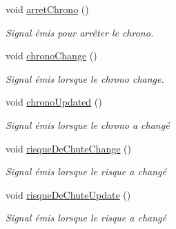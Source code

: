 \begin{DoxyCompactItemize}
void \hyperlink{class_peripherique_local_a150599c1ded2462eb0e2d1d943459a34}{arret\+Chrono} ()
\begin{DoxyCompactList}\small\item\em Signal émis pour arrêter le chrono. \end{DoxyCompactList}\item 
void \hyperlink{class_peripherique_local_ae2560469bb9aa4597b9064f159d3956d}{chrono\+Change} ()
\begin{DoxyCompactList}\small\item\em Signal émis lorsque le chrono change. \end{DoxyCompactList}\item 
void \hyperlink{class_peripherique_local_a8900d04b38a366bf786d608a741d2dc0}{chrono\+Updated} ()
\begin{DoxyCompactList}\small\item\em Signal émis lorsque le chrono a changé \end{DoxyCompactList}\item 
void \hyperlink{class_peripherique_local_adfe5bde79cfe1f585dbbdf21269ebe2b}{risque\+De\+Chute\+Change} ()
\begin{DoxyCompactList}\small\item\em Signal émis lorsque le risque a changé \end{DoxyCompactList}\item 
void \hyperlink{class_peripherique_local_a4c2e32ed7feda45c6347144a99be7525}{risque\+De\+Chute\+Update} ()
\begin{DoxyCompactList}\small\item\em Signal émis lorsque le risque a changé \end{DoxyCompactList}\end{DoxyCompactItemize}

